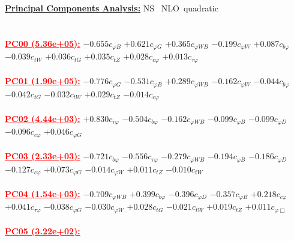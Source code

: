\documentclass{article}
\begin{document}
\noindent \underline{\bf{Principal Components Analysis}:} \rm NS \ NLO\ quadratic\\ \\ \\
\noindent \textcolor{red}{\underline{\bf{PC00} (5.36e+05):}}
{$-0.655$}{\rm $c_{\varphi B}$} 
{$+0.621$}{\rm $c_{\varphi G}$} 
{$+0.365$}{\rm $c_{\varphi WB}$} 
{$-0.199$}{\rm $c_{\varphi W}$} 
{$+0.087$}{\rm $c_{b \varphi}$} 
{$-0.039$}{\rm $c_{tW}$} 
{$+0.036$}{\rm $c_{tG}$} 
{$+0.035$}{\rm $c_{tZ}$} 
{$+0.028$}{\rm $c_{c \varphi}$} 
{$+0.013$}{\rm $c_{\tau \varphi}$} 
 \nonumber \\ \nonumber \\ 
\noindent \textcolor{red}{\underline{\bf{PC01} (1.90e+05):}}
{$-0.776$}{\rm $c_{\varphi G}$} 
{$-0.531$}{\rm $c_{\varphi B}$} 
{$+0.289$}{\rm $c_{\varphi WB}$} 
{$-0.162$}{\rm $c_{\varphi W}$} 
{$-0.044$}{\rm $c_{b \varphi}$} 
{$-0.042$}{\rm $c_{tG}$} 
{$-0.032$}{\rm $c_{tW}$} 
{$+0.029$}{\rm $c_{tZ}$} 
{$-0.014$}{\rm $c_{c \varphi}$} 
 \nonumber \\ \nonumber \\ 
\noindent \textcolor{red}{\underline{\bf{PC02} (4.44e+03):}}
{$+0.830$}{\rm $c_{\tau \varphi}$} 
{$-0.504$}{\rm $c_{b \varphi}$} 
{$-0.162$}{\rm $c_{\varphi WB}$} 
{$-0.099$}{\rm $c_{\varphi B}$} 
{$-0.099$}{\rm $c_{\varphi D}$} 
{$-0.096$}{\rm $c_{c \varphi}$} 
{$+0.046$}{\rm $c_{\varphi G}$} 
 \nonumber \\ \nonumber \\ 
\noindent \textcolor{red}{\underline{\bf{PC03} (2.33e+03):}}
{$-0.721$}{\rm $c_{b \varphi}$} 
{$-0.556$}{\rm $c_{\tau \varphi}$} 
{$-0.279$}{\rm $c_{\varphi WB}$} 
{$-0.194$}{\rm $c_{\varphi B}$} 
{$-0.186$}{\rm $c_{\varphi D}$} 
{$-0.127$}{\rm $c_{c \varphi}$} 
{$+0.073$}{\rm $c_{\varphi G}$} 
{$-0.014$}{\rm $c_{\varphi W}$} 
{$+0.011$}{\rm $c_{tZ}$} 
{$-0.010$}{\rm $c_{tW}$} 
 \nonumber \\ \nonumber \\ 
\noindent \textcolor{red}{\underline{\bf{PC04} (1.54e+03):}}
{$-0.709$}{\rm $c_{\varphi WB}$} 
{$+0.399$}{\rm $c_{b \varphi}$} 
{$-0.396$}{\rm $c_{\varphi D}$} 
{$-0.357$}{\rm $c_{\varphi B}$} 
{$+0.218$}{\rm $c_{c \varphi}$} 
{$+0.041$}{\rm $c_{\tau \varphi}$} 
{$-0.038$}{\rm $c_{\varphi G}$} 
{$-0.030$}{\rm $c_{\varphi W}$} 
{$+0.028$}{\rm $c_{tG}$} 
{$-0.021$}{\rm $c_{tW}$} 
{$+0.019$}{\rm $c_{tZ}$} 
{$+0.011$}{\rm $c_{\varphi \Box}$} 
 \nonumber \\ \nonumber \\ 
\noindent \textcolor{red}{\underline{\bf{PC05} (3.22e+02):}}
\end{document}
